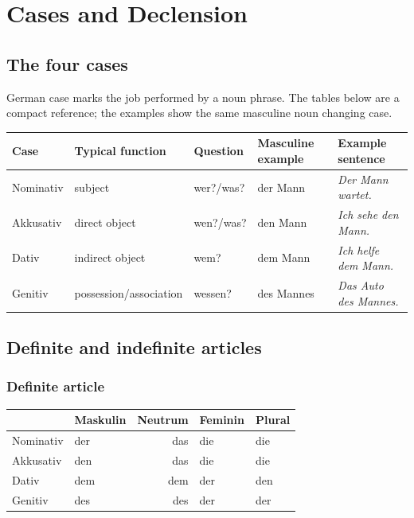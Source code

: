 \chapter{Cases and Declension}

\section{The four cases}

German case marks the job performed by a noun phrase. The tables below are a
compact reference; the examples show the same masculine noun changing case.

\begin{center}
\begin{tabularx}{\textwidth}{@{}llllX@{}}
\toprule
Case & Typical function & Question & Masculine example & Example sentence \\
\midrule
\rowcolor{caseNominativeBg}
Nominativ & subject & wer?/was? & der Mann & \textit{Der Mann wartet.} \\
\rowcolor{caseAccusativeBg}
Akkusativ & direct object & wen?/was? & den Mann & \textit{Ich sehe den Mann.} \\
\rowcolor{caseDativeBg}
Dativ & indirect object & wem? & dem Mann & \textit{Ich helfe dem Mann.} \\
\rowcolor{caseGenitiveBg}
Genitiv & possession/association & wessen? & des Mannes & \textit{Das Auto des Mannes.} \\
\bottomrule
\end{tabularx}
\end{center}

\section{Definite and indefinite articles}

\subsection{Definite article}

\begin{center}
\begin{tabular}{@{}lMNFP@{}}
\toprule
 & Maskulin & Neutrum & Feminin & Plural \\
\midrule
{}
Nominativ & der & das & die & die \\
Akkusativ & den & das & die & die \\
Dativ & dem & dem & der & den \\
Genitiv & des & des & der & der \\
\bottomrule
\end{tabular}
\end{center}

